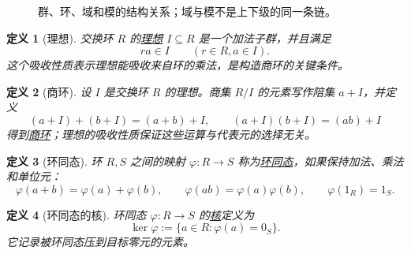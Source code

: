 \documentclass[UTF8,fontset=none,a4paper,11pt]{ctexart}
\theoremstyle{foundation-definition}
\newtheorem{definition}{定义}[section]
\theoremstyle{foundation-theorem}
\theoremstyle{foundation-proposition}
\theoremstyle{foundation-example}
\theoremstyle{foundation-remark}
\theoremstyle{foundation-theorem}
\newcommand{\term}[2]{\hyperref[#1]{#2}}
\begin{document}
\begin{figure}[htbp]
\centering
{}
\caption{群、环、域和模的结构关系；域与模不是上下级的同一条链。}
\label{fig:algebra-ladder}
\end{figure}

\begin{definition}[理想]\label{def:ideal}
交换环 \(R\) 的\term{def:ideal}{理想} \(I\subseteq R\) 是一个加法子群，并且满足
\[
r a\in I\qquad(r\in R, a\in I).
\]
这个吸收性质表示理想能吸收来自环的乘法，是构造商环的关键条件。
\end{definition}

\begin{definition}[商环]\label{def:quotient-ring}
设 \(I\) 是交换环 \(R\) 的理想。商集 \(R/I\) 的元素写作陪集 \(a+I\)，并定义
\[
(a+I)+(b+I)=(a+b)+I,
\qquad
(a+I)(b+I)=(ab)+I
\]
得到\term{def:quotient-ring}{商环}；理想的吸收性质保证这些运算与代表元的选择无关。
\end{definition}

\begin{definition}[环同态]\label{def:ring-hom}
环 \(R,S\) 之间的映射 \(\varphi:R\to S\) 称为\term{def:ring-hom}{环同态}，如果保持加法、乘法和单位元：
\[
\varphi(a+b)=\varphi(a)+\varphi(b),
\qquad
\varphi(ab)=\varphi(a)\varphi(b),
\qquad
\varphi(1_R)=1_S.
\]
\end{definition}

\begin{definition}[环同态的核]\label{def:ring-kernel}
环同态 \(\varphi:R\to S\) 的\term{def:ring-kernel}{核}定义为
\[
\ker\varphi:=\{a\in R:\varphi(a)=0_S\}.
\]
它记录被环同态压到目标零元的元素。
\end{definition}
\end{document}
